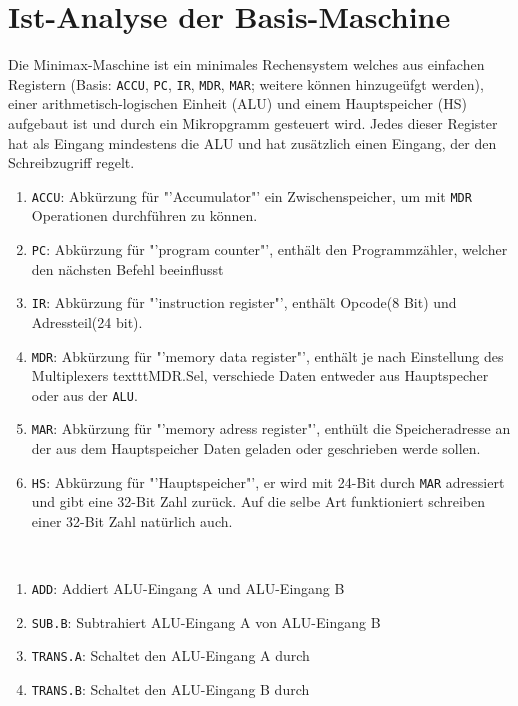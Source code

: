 \documentclass[12pt,titlepage]{article}
\begin{document}
\newpage

\section{Ist-Analyse der Basis-Maschine}

Die Minimax-Maschine ist ein minimales Rechensystem welches aus einfachen Registern (Basis: \texttt{ACCU}, \texttt{PC}, \texttt{IR}, \texttt{MDR}, \texttt{MAR};
weitere k{\"o}nnen hinzuge{\"u}fgt werden), einer arithmetisch-logischen Einheit (ALU) und einem Hauptspeicher (HS) aufgebaut
ist und durch ein Mikropgramm gesteuert wird. Jedes dieser Register hat als Eingang mindestens die ALU und hat zusätzlich einen Eingang, der den Schreibzugriff regelt.\\
\begin{enumerate}
\item \texttt{ACCU}: Abk{\"u}rzung f{\"u}r "'Accumulator"' ein Zwischenspeicher, um mit \texttt{MDR} Operationen durchführen zu k{\"o}nnen.
\item \texttt{PC}: Abk{\"u}rzung f{\"u}r "'program counter"', enthält den Programmzähler, welcher den nächsten Befehl beeinflusst
\item \texttt{IR}: Abk{\"u}rzung f{\"u}r "'instruction register"', enthält Opcode(8 Bit) und Adressteil(24 bit).
\item \texttt{MDR}: Abk{\"u}rzung f{\"u}r "'memory data register"', enthält je nach Einstellung des Multiplexers texttt{MDR.Sel}, verschiede Daten entweder aus Hauptspecher oder aus der \texttt{ALU}.
\item \texttt{MAR}: Abk{\"u}rzung f{\"u}r "'memory adress register"', enth{\"u}lt die Speicheradresse an der aus dem Hauptspeicher Daten geladen oder geschrieben werde sollen.
\item \texttt{HS}: Abk{\"u}rzung f{\"u}r "'Hauptspeicher"', er wird mit 24-Bit durch \texttt{MAR} adressiert und gibt eine 32-Bit Zahl zur{\"u}ck. Auf die selbe Art funktioniert schreiben einer 32-Bit Zahl nat{\"u}rlich auch.
\end{enumerate}

\leavevmode \\

\begin{enumerate}
\item \texttt{ADD}: Addiert ALU-Eingang A und ALU-Eingang B
\item \texttt{SUB.B}: Subtrahiert ALU-Eingang A von ALU-Eingang B
\item \texttt{TRANS.A}: Schaltet den ALU-Eingang A durch
\item \texttt{TRANS.B}: Schaltet den ALU-Eingang B durch
\end{enumerate}
\end{document}
